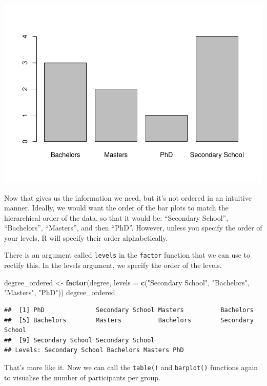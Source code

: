 \documentclass[
]{book}
\newenvironment{Shaded}{\begin{snugshade}}{\end{snugshade}}
\newcommand{\AttributeTok}[1]{\textcolor[rgb]{0.13,0.29,0.53}{#1}}
\newcommand{\FunctionTok}[1]{\textcolor[rgb]{0.13,0.29,0.53}{\textbf{#1}}}
\newcommand{\NormalTok}[1]{#1}
\newcommand{\OtherTok}[1]{\textcolor[rgb]{0.56,0.35,0.01}{#1}}
\newcommand{\StringTok}[1]{\textcolor[rgb]{0.31,0.60,0.02}{#1}}
\begin{document}
\includegraphics{rintro_demo_files/figure-latex/unnamed-chunk-134-1.pdf}

Now that gives us the information we need, but it's not ordered in an intuitive manner. Ideally, we would want the order of the bar plots to match the hierarchical order of the data, so that it would be: ``Secondary School'', ``Bachelors'', ``Masters'', and then ``PhD''. However, unless you specify the order of your levels, R will specify their order alphabetically.

There is an argument called \texttt{levels} in the \texttt{factor} function that we can use to rectify this. In the levels argument, we specify the order of the levels.

\begin{Shaded}
\begin{Highlighting}[]
\NormalTok{degree\_ordered }\OtherTok{\textless{}{-}} \FunctionTok{factor}\NormalTok{(degree, }\AttributeTok{levels =} \FunctionTok{c}\NormalTok{(}\StringTok{"Secondary School"}\NormalTok{, }\StringTok{"Bachelors"}\NormalTok{, }\StringTok{"Masters"}\NormalTok{, }\StringTok{"PhD"}\NormalTok{))}
\NormalTok{degree\_ordered}
\end{Highlighting}
\end{Shaded}

\begin{verbatim}
##  [1] PhD              Secondary School Masters          Bachelors       
##  [5] Bachelors        Masters          Bachelors        Secondary School
##  [9] Secondary School Secondary School
## Levels: Secondary School Bachelors Masters PhD
\end{verbatim}

That's more like it. Now we can call the \texttt{table()} and \texttt{barplot()} functions again to visualise the number of participants per group.
\end{document}
